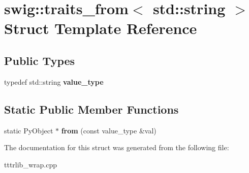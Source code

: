 \hypertarget{structswig_1_1traits__from_3_01std_1_1string_01_4}{}\section{swig\+:\+:traits\+\_\+from$<$ std\+:\+:string $>$ Struct Template Reference}
\label{structswig_1_1traits__from_3_01std_1_1string_01_4}
\subsection*{Public Types}
\begin{DoxyCompactItemize}
\item 
\mbox{\label{structswig_1_1traits__from_3_01std_1_1string_01_4_a873f8111e50ab64c5f0711f3fc8479ad}} 
typedef std\+::string {\bfseries value\+\_\+type}
\end{DoxyCompactItemize}
\subsection*{Static Public Member Functions}
\begin{DoxyCompactItemize}
\item 
\mbox{\label{structswig_1_1traits__from_3_01std_1_1string_01_4_af6e0987239b6f657facf1fc5fcbddea6}} 
static Py\+Object $\ast$ {\bfseries from} (const value\+\_\+type \&val)
\end{DoxyCompactItemize}


The documentation for this struct was generated from the following file\+:\begin{DoxyCompactItemize}
\item 
tttrlib\+\_\+wrap.\+cpp\end{DoxyCompactItemize}
